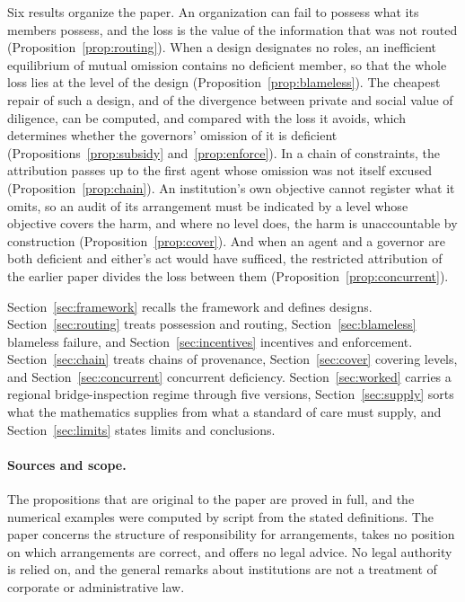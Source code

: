 \documentclass[11pt]{article}
\theoremstyle{plain}
\theoremstyle{definition}
\begin{document}
Six results organize the paper. An organization can fail to possess what its members possess, and the loss is the value of the information that was not routed (Proposition~\ref{prop:routing}). When a design designates no roles, an inefficient equilibrium of mutual omission contains no deficient member, so that the whole loss lies at the level of the design (Proposition~\ref{prop:blameless}). The cheapest repair of such a design, and of the divergence between private and social value of diligence, can be computed, and compared with the loss it avoids, which determines whether the governors' omission of it is deficient (Propositions~\ref{prop:subsidy} and~\ref{prop:enforce}). In a chain of constraints, the attribution passes up to the first agent whose omission was not itself excused (Proposition~\ref{prop:chain}). An institution's own objective cannot register what it omits, so an audit of its arrangement must be indicated by a level whose objective covers the harm, and where no level does, the harm is unaccountable by construction (Proposition~\ref{prop:cover}). And when an agent and a governor are both deficient and either's act would have sufficed, the restricted attribution of the earlier paper divides the loss between them (Proposition~\ref{prop:concurrent}).

Section~\ref{sec:framework} recalls the framework and defines designs. Section~\ref{sec:routing} treats possession and routing, Section~\ref{sec:blameless} blameless failure, and Section~\ref{sec:incentives} incentives and enforcement. Section~\ref{sec:chain} treats chains of provenance, Section~\ref{sec:cover} covering levels, and Section~\ref{sec:concurrent} concurrent deficiency. Section~\ref{sec:worked} carries a regional bridge-inspection regime through five versions, Section~\ref{sec:supply} sorts what the mathematics supplies from what a standard of care must supply, and Section~\ref{sec:limits} states limits and conclusions.

\paragraph{Sources and scope.} The propositions that are original to the paper are proved in full, and the numerical examples were computed by script from the stated definitions. The paper concerns the structure of responsibility for arrangements, takes no position on which arrangements are correct, and offers no legal advice. No legal authority is relied on, and the general remarks about institutions are not a treatment of corporate or administrative law.
\end{document}
